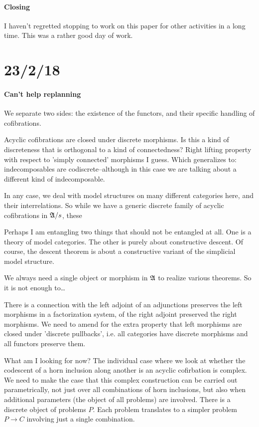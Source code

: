 \documentclass[csh.tex]{subfiles}
\begin{document}
\paragraph{Closing}
I haven't regretted stopping to work on this paper for other activities in a long time. This was a rather good day of work.

\section{23/2/18}
\paragraph{Can't help replanning}
We separate two sides: the existence of the functors, and their specific handling of cofibrations.

Acyclic cofibrations are closed under discrete morphisms. Is this a kind of discreteness that is orthogonal to a kind of connectedness?
Right lifting property with respect to 'simply connected' morphisms I guess. Which generalizes to: indecomposables are codiscrete--although in this case we are talking about a different kind of indecomposable.

In any case, we deal with model structures on many different categories here, and their interrelations. So while we have a generic discrete family of acyclic cofibrations in $\mathfrak A/s$, these 


Perhaps I am entangling two things that should not be entangled at all. One is a theory of model categories. The other is purely about constructive descent.
Of course, the descent theorem is about a constructive variant of the simplicial model structure. 

We always need a single object or morphism in $\mathfrak A$ to realize various theorems. So it is not enough to\dots

There is a connection with the left adjoint of an adjunctions preserves the left morphisms in a factorization system, of the right adjoint preserved the right morphisms. We need to amend for the extra property that left morphisms are closed under 'discrete pullbacks', i.e. all categories have discrete morphisms and all functors preserve them.

What am I looking for now?
The individual case where we look at whether the codescent of a horn inclusion along another is an acyclic cofirbation is complex. We need to make the case that this complex construction can be carried out parametrically, not just over all combinations of horn inclusions, but also when additional parameters (the object of all problems) are involved.
There is a discrete object of problems $P$. Each problem translates to a simpler problem $P \to C$ involving just a single combination.
\end{document}
